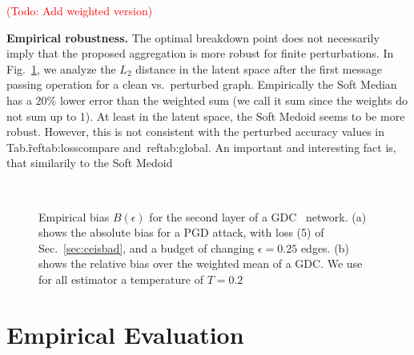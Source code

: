 \documentclass[sigconf,authordraft]{acmart}
\newcommand{\todo}[1]{\textcolor{red}{(Todo: #1)}}
\begin{document}
\todo{Add weighted version}

\textbf{Empirical robustness.} The optimal breakdown point does not necessarily imply that the proposed aggregation is more robust for finite perturbations. In Fig.~\ref{fig:empbiascurve}, we analyze the \(L_2\) distance in the latent space after the first message passing operation for a clean vs.\ perturbed graph. Empirically the Soft Median has a 20\% lower error than the weighted sum (we call it sum since the weights do not sum up to 1). At least in the latent space, the Soft Medoid seems to be more robust. However, this is not consistent with the perturbed accuracy values in Tab.\~ref{tab:losscompare} and~ref{tab:global}. An important and interesting fact is, that similarily to the Soft Medoid

\begin{figure}
  \centering
  \hbox{\hspace{15pt} \resizebox{0.9\linewidth}{!}{}}
  \vspace{-14pt}
  \caption{Empirical bias \(B(\epsilon)\) for the second layer of a GDC~\citep{Klicpera2019a} network. (a) shows the absolute bias for a PGD attack, with loss (5) of Sec.~\ref{sec:ceisbad}, and a budget of changing \(\epsilon=0.25\) edges. (b) shows the relative bias over the weighted mean of a GDC. We use for all estimator a temperature of \(T=0.2\)\label{fig:empbiascurve}}
\end{figure}

\section{Empirical Evaluation}\label{sec:empirical}
\end{document}
